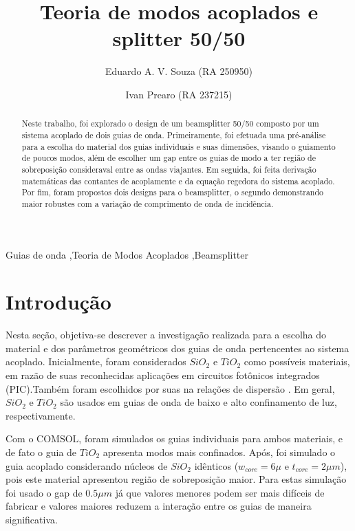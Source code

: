\documentclass[final,12pt,times,twocolumn]{elsarticle}
\begin{document}
\begin{frontmatter}

\title{Teoria de modos acoplados e splitter 50/50}

\author[1]{Eduardo A. V. Souza (RA 250950)}
\author[1]{Ivan Prearo (RA 237215)}


\begin{abstract}
    Neste trabalho, foi explorado o design de um beamsplitter 50/50 composto por um sistema acoplado de dois guias de onda. Primeiramente, foi efetuada uma pré-análise para a escolha do material dos guias individuais e suas dimensões, visando o guiamento de poucos modos, além de escolher um gap entre os guias de modo a ter região de sobreposição consideraval entre as ondas viajantes. Em seguida, foi feita derivação matemáticas das contantes de acoplamente e da equação regedora do sistema acoplado. Por fim, foram propostos dois designs para o beamsplitter, o segundo demonstrando maior robustes com a variação de comprimento de onda de incidência.
\end{abstract}

\begin{keyword}
    Guias de onda \sep Teoria de Modos Acoplados \sep Beamsplitter
\end{keyword}

\end{frontmatter}

\section{Introdução}
\label{sec:intro}

Nesta seção, objetiva-se descrever a investigação realizada para a escolha do material e dos parâmetros geométricos dos guias de onda pertencentes ao sistema acoplado. Inicialmente, foram considerados $SiO_2$ e $TiO_2$ como possíveis materiais, em razão de suas reconhecidas aplicações em circuitos fotônicos integrados (PIC).Também foram escolhidos por suas na relações de dispersão \cite{dispersao}. Em geral, $SiO_2$ e $TiO_2$ são usados em guias de onda de baixo e alto confinamento de luz, respectivamente.

Com o COMSOL, foram simulados os guias individuais para ambos materiais, e de fato o guia de $TiO_2$ apresenta modos mais confinados. Após, foi simulado o guia acoplado considerando núcleos de $SiO_2$ idênticos ($w_{core} = 6\mu$ e $t_{core} = 2\mu m$), pois este material apresentou região de sobreposição maior. Para estas simulação foi usado o gap de $0.5\mu m$ já que valores menores podem ser mais difíceis de fabricar e valores maiores reduzem a interação entre os guias de maneira significativa.
\end{document}
